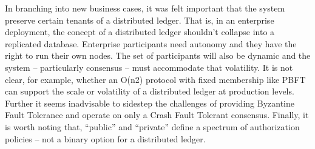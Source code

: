 In branching into new business cases, it was felt important that the system preserve certain tenants of a distributed ledger. That is, in an enterprise deployment, the concept of a distributed ledger shouldn't collapse into a replicated database. Enterprise participants need autonomy and they have the right to run their own nodes. The set of participants will also be dynamic and the system – particularly consensus – must accommodate that volatility. It is not clear, for example, whether an O(n2) protocol with fixed membership like PBFT can support the scale or volatility of a distributed ledger at production levels. Further it seems inadvisable to sidestep the challenges of providing Byzantine Fault Tolerance and operate on only a Crash Fault Tolerant consensus. Finally, it is worth noting that, “public” and “private” define a spectrum of authorization policies – not a binary option for a distributed ledger.
